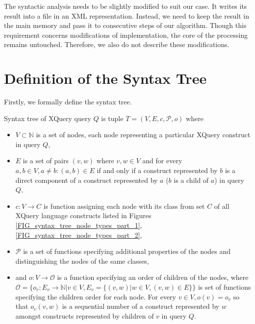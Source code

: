 The syntactic analysis needs to be slightly modified to suit our case. It writes its result into a file in an XML representation. Instead, we need to keep the result in the main memory and pass it to consecutive steps of our algorithm. Though this requirement concerns modifications of implementation, the core of the processing remains untouched. Therefore, we also do not describe these modifications.

\section{Definition of the Syntax Tree}
Firstly, we formally define the syntax tree.

\begin{define}
\label{DEF_syntax_tree}
Syntax tree of XQuery query $Q$ is tuple $T = (V, E, c, \mathcal{P}, o)$ where
\begin{itemize}
\item $V \subset \mathbb{N}$ is a set of nodes, each node representing a particular XQuery construct in query $Q$,
\item $E$ is a set of pairs $(v, w)$ where $v,w \in V$ and for every $a, b \in V, a \neq b: (a, b) \in E$ if and only if a construct represented by $b$ is a direct component of a construct represented by $a$ ($b$ is a child of $a$) in query $Q$,
\item $c: V \rightarrow C$ is function assigning each node with its class from set $C$ of all XQuery language constructs listed in Figures \ref{FIG_syntax_tree_node_types_part_1}, \ref{FIG_syntax_tree_node_types_part_2},
\item $\mathcal{P}$ is a set of functions specifying additional properties of the nodes and distinguishing the nodes of the same classes,
\item and $o : V \rightarrow \mathcal{O}$ is a function specifying an order of children of the nodes, where $\mathcal{O} = \{o_v : E_v \rightarrow \mathbb{N} | v \in V, E_v = \{(v, w) | w \in V, (v,w) \in E\}\}$ is set of functions specifying the children order for each node. For every $v \in V, o(v) = o_v$ so that $o_v(v,w)$ is a sequential number of a construct represented by $w$ amongst constructs represented by children of $v$ in query $Q$.
\end{itemize}
\end{define}

